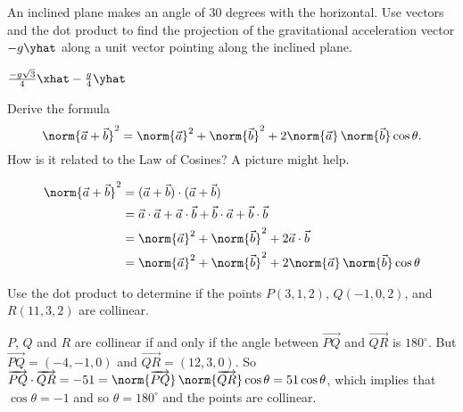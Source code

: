 \begin{exercises}
\begin{problist}
		\prob   An inclined plane makes an angle of $30$ degrees with the horizontal.  Use
			vectors and the dot product to find the projection of the gravitational
			acceleration vector $-g\yhat$ along a unit vector pointing along the inclined
			plane.
            \begin{solution}
                $\frac{-g\sqrt3}{4}\xhat - \frac{g}{4}\yhat$
            \end{solution}

		\prob   Derive the formula \[\norm{\vec{a} + \vec{b}}^2 = \norm{\vec{a}}^2 +
			\norm{\vec{b}}^2 + 2\norm{\vec{a}}\,\norm{\vec{b}}\cos\theta.\] How is it
			related to the Law of Cosines?  A picture might help.
            \begin{solution}
                \begin{align*}
                    \norm{\vec{a}+\vec{b}}^2 &= (\vec{a}+\vec{b})\cdot(\vec{a}+\vec{b}) \\
                                             &= \vec{a}\cdot\vec{a} + \vec{a}\cdot\vec{b} + \vec{b}
                    \cdot \vec{a} + \vec{b} \cdot \vec{b} \\
                    &= \norm{\vec{a}}^2 + \norm{\vec{b}}^2 + 2\vec{a}\cdot\vec{b} \\
                    &= \norm{\vec{a}}^2 + \norm{\vec{b}}^2 + 2\norm{\vec{a}}\,\norm{\vec{b}}\cos\theta
                \end{align*}
            \end{solution}

		\prob   Use the dot product to determine if the points $P(3,1,2)$, $Q(-1,0,2)$, and
			$R(11, 3, 2)$ are collinear.
            \begin{solution}
                $P$, $Q$ and $R$ are collinear if and only if the angle between $\overrightarrow{PQ}$
                and $\overrightarrow{QR}$ is $180^\circ$.  But $\overrightarrow{PQ}=(-4,-1,0)$ and
                $\overrightarrow{QR} = (12,3,0)$. So $\overrightarrow{PQ}\cdot \overrightarrow{QR} = -51
                = \norm{\overrightarrow{PQ}}\,\norm{\overrightarrow{QR}} \cos \theta = 51\cos \theta$,
                which implies that $\cos \theta=-1$ and so $\theta=180^\circ$ and the points are
                collinear.
            \end{solution}


\end{problist}
\end{exercises}

